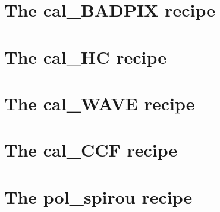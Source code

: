 \section{The cal\_BADPIX recipe}
\label{ch:the_recipes:cal_BADPIX_spirou}



\section{The cal\_HC recipe}
\label{ch:the_recipes:cal_HC_E2DS_spirou}



\section{The cal\_WAVE recipe}
\label{ch:the_recipes:cal_WAVE_E2DS_spirou}



\section{The cal\_CCF recipe}
\label{ch:the_recipes:cal_CCF_E2DS_spirou}


\section{The pol\_spirou recipe}
\label{ch:the_recipes:pol_spirou}
